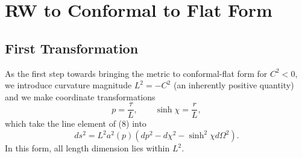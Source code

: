 \documentclass[10pt,letterpaper]{article}
\begin{document}
\section*{RW to Conformal to Flat Form}
\subsection*{First Transformation}
As the first step towards bringing the metric to conformal-flat form for $C^2<0$, we introduce curvature magnitude $L^2 = -C^2$ (an inherently positive quantity) and we make coordinate transformations 
\begin{equation}
p = \frac{\tau}{L},\qquad \sinh \chi = \frac{r}{
L},
\end{equation}
which take the line element of (8) into
\begin{equation}
 ds^2 = L^2 a^2(p) \left( dp^2 - d\chi^2 - \sinh^2\chi d\Omega^2\right).
\end{equation}
In this form, all length dimension lies within $L^2$. 
\end{document}
